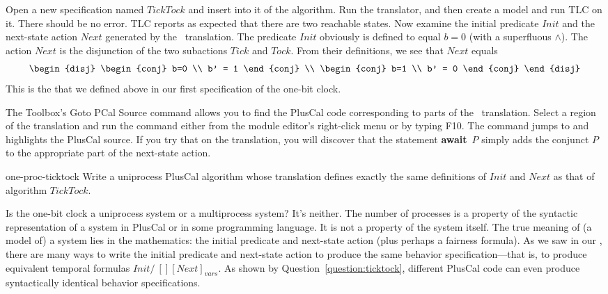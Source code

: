 \documentclass[fleqn,leqno]{article}
\begin{document}
Open a new specification named $TickTock$ and insert into it
 of the algorithm.
Run the translator, and then create a model and run TLC on it.  There
should be no error. TLC reports as expected that there are two
reachable states.  Now examine the initial predicate $Init$ and the
next-state action $Next$ generated by the \tlaplus\ translation.  The
predicate $Init$ obviously is defined to equal $b=0$ (with a
superfluous $\land$).  The action $Next$ is the disjunction of the
two subactions $Tick$ and $Tock$.  From their definitions, we see that
$Next$ equals
 \[\begin{disj}
    \begin{conj}
    b=0 \\ b' = 1
    \end{conj} \\
    \begin{conj}
    b=1 \\ b' = 0
    \end{conj}
   \end{disj}
  \]
This is the  that we defined above in
our first specification of the one-bit clock.  

The Toolbox's 
\textsf{Goto PCal Source} command allows you to find the
PlusCal code corresponding to parts of the \tlaplus\ translation.
Select a region of the translation and run the command either from the
module editor's right-click menu or by typing \textsf{F10}.  The
command jumps to and highlights the PlusCal source.  If you try that
on the translation, you will discover that the statement
\textbf{await}~$P$ simply adds the conjunct $P$ to the appropriate
part of the next-state action.

\begin{aquestion}{one-proc-ticktock} \label{question:ticktock}
Write a uniprocess PlusCal algorithm whose translation defines exactly
the same definitions of $Init$ and $Next$ as that of algorithm $TickTock$.
\end{aquestion}
%
Is the one-bit clock a uniprocess system or a multiprocess system?
It's neither.  The number of processes is a property of the syntactic
representation of a system in PlusCal or in some programming language.
It is not a property of the system itself.  The true meaning of (a
model of) a system lies in the mathematics: the initial predicate and
next-state action (plus perhaps a fairness formula).  As we saw in our
, there
are many ways to write the initial predicate and next-state action to
produce the same behavior specification---that is, to produce equivalent
temporal formulas $Init /\ [][Next]_{vars}$.  As shown by
Question~\ref{question:ticktock}, different PlusCal code can even
produce syntactically identical behavior specifications.
\end{document}
